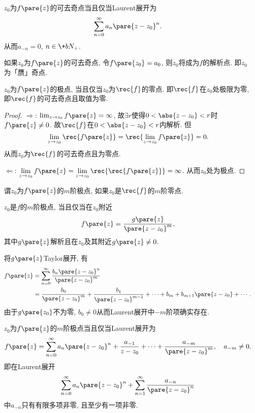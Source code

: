 \documentclass[../ComplexVariable.tex]{subfiles}
\begin{document}
\begin{theorem}
    $z_0$为$f\pare{z}$的可去奇点当且仅当Laurent展开为
    \[ \sum_{n=0}^\infty a_n\pare{z-z_0}^n. \]
    从而$a_{-n} = 0$, $n \in \+bN_+$.
\end{theorem}
\begin{remark}
    如果$z_0$为$f\pare{z}$的可去奇点, 令$f\pare{z_0} = a_0$, 则$z_0$将成为$f$的解析点. 即$z_0$为「赝」奇点.
\end{remark}
\begin{theorem}
    $z_0$为$f\pare{z}$的极点, 当且仅当$z_0$为$\displaystyle \rec{f}$的零点. 即$\displaystyle \rec{f}$在$z_0$处极限为零, 即$\displaystyle \rec{f}$的可去奇点且取值为零.
\end{theorem}
\begin{proof}
    $\Rightarrow$: $\lim_{z\rightarrow z_0} f\pare{z} = \infty$, 故$\exists r$使得$0<\abs{z-z_0}<r$时$f\pare{z} \neq 0$. 故$\displaystyle \rec{f}$在$0<\abs{z-z_0}<r$内解析. 但
    \[ \lim_{z\rightarrow z_0} \rec{f\pare{z}} = \rec{\lim_{z\rightarrow z_0} f\pare{z}} = 0. \]
    从而$z_0$为$\displaystyle \rec{f}$的可去奇点且为零点.
    \par
    $\Leftarrow$: $\displaystyle \lim_{z\rightarrow z_0} f\pare{z} = \lim_{z\rightarrow z_0} \rec{\rec{f\pare{z}}} = \infty$. 从而$z_0$处为极点.
\end{proof}
\begin{theorem}
    谓$z_0$为$f\pare{z}$的$m$阶极点, 如果$z_0$是$\displaystyle \rec{f}$的$m$阶零点.
\end{theorem}
\begin{theorem}
    $z_0$是$f$的$m$阶极点, 当且仅当在$z_0$附近
    \[ f\pare{z} = \frac{g\pare{z}}{\pare{z-z_0}^m}, \]
    其中$g\pare{z}$解析且在$z_0$及其附近$g\pare{z}\neq 0$.
\end{theorem}
将$g\pare{z}$Taylor展开, 有
\begin{align*}
    f\pare{z} &= \sum_{n=0}^\infty \frac{b_n\pare{z-z_0}^n}{\pare{z-z_0}^m}\\ &= \frac{b_0}{\pare{z-z_0}^m} + \frac{b_1}{\pare{z-z_0}^{m-1}} + \cdots + b_m + b_{m+1}\pare{z-z_0} + \cdots.
\end{align*}
由于$g\pare{z_0}$不为零, $b_0\neq 0$从而Laurent展开中$-m$阶项确实存在.
\begin{theorem}
    $z_0$为$f\pare{z}$的$m$阶极点当且仅当Laurent展开为
    \[ f\pare{z} = \sum_{n=0}^\infty a_n\pare{z-z_0}^n + \frac{a_{-1}}{z-z_0} + \cdots + \frac{a_{-m}}{\pare{z-z_0}^m}, \quad a_{-m}\neq 0. \]
    即在Laurent展开
    \[ \sum_{n=0}^\infty a_n\pare{z-z_0}^n + \sum_{n=1}^\infty \frac{a_{-n}}{\pare{z-z_0}^n} \]
    中$a_{-n}$只有有限多项非零, 且至少有一项非零.
\end{theorem}
\end{document}
